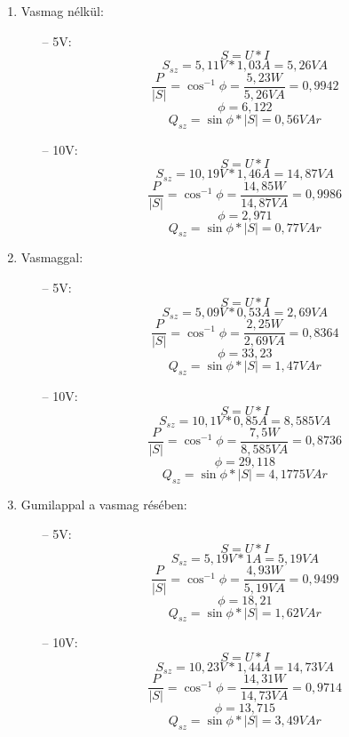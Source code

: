 \documentclass[10pt,a4paper]{article}
\begin{document}
\begin{enumerate}
	\item Vasmag nélkül:
		\begin{itemize}
			\item[--] 5V:
			$$S = U * I$$
			$$S_{sz} = 5,11 V * 1,03 A =5,26 VA $$
			$$\frac{P}{\left|S\right|} = \cos^{-1} \phi = \frac{5,23 W}{5,26 VA} = 0,9942$$
			$$\phi = 6,122$$
			$$Q_{sz} = \sin \phi *\left|S\right| = 0,56 VAr$$
			\item[--] 10V:
			$$S = U * I$$
			$$S_{sz} = 10,19 V * 1,46 A =14,87 VA $$
			$$\frac{P}{\left|S\right|} = \cos^{-1} \phi = \frac{14,85 W}{14,87 VA} = 0,9986$$
			$$\phi = 2,971$$
			$$Q_{sz} = \sin \phi *\left|S\right| = 0,77 VAr$$
		\end{itemize}
		\newpage
		\item Vasmaggal:
		\begin{itemize}
			\item[--] 5V:
			$$S = U * I$$
			$$S_{sz} = 5,09 V * 0,53 A =2,69 VA $$
			$$\frac{P}{\left|S\right|} = \cos^{-1} \phi = \frac{2,25 W}{2,69 VA} = 0,8364$$
			$$\phi = 33,23$$
			$$Q_{sz} = \sin \phi *\left|S\right| = 1,47 VAr$$
			\item[--] 10V:
			$$S = U * I$$
			$$S_{sz} = 10,1 V * 0,85 A =8,585 VA $$
			$$\frac{P}{\left|S\right|} = \cos^{-1} \phi = \frac{7,5 W}{8,585 VA} = 0,8736$$
			$$\phi = 29,118$$
			$$Q_{sz} = \sin \phi *\left|S\right| = 4,1775 VAr$$
		\end{itemize}
		\item Gumilappal a vasmag résében:
		\begin{itemize}
			\item[--] 5V:
			$$S = U * I$$
			$$S_{sz} = 5,19 V * 1 A =5,19 VA $$
			$$\frac{P}{\left|S\right|} = \cos^{-1} \phi = \frac{4,93 W}{5,19 VA} = 0,9499$$
			$$\phi = 18,21$$
			$$Q_{sz} = \sin \phi *\left|S\right| = 1,62 VAr$$
			\item[--] 10V:
			$$S = U * I$$
			$$S_{sz} = 10,23 V * 1,44 A =14,73 VA $$
			$$\frac{P}{\left|S\right|} = \cos^{-1} \phi = \frac{14,31 W}{14,73 VA} = 0,9714$$
			$$\phi = 13,715$$
			$$Q_{sz} = \sin \phi *\left|S\right| = 3,49 VAr$$
		\end{itemize}
\end{enumerate}
\newpage
\end{document}
